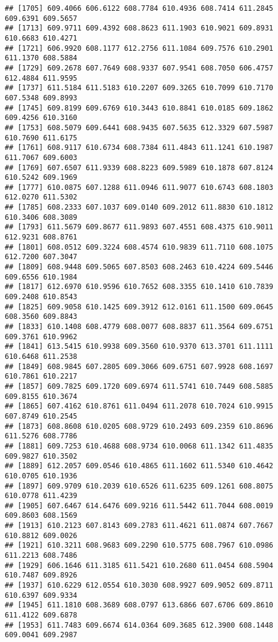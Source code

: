 \documentclass[
]{article}
\begin{document}
\begin{verbatim}
## [1705] 609.4066 606.6122 608.7784 610.4936 608.7414 611.2845 609.6391 609.5657
## [1713] 609.9711 609.4392 608.8623 611.1903 610.9021 609.8931 610.6683 610.4271
## [1721] 606.9920 608.1177 612.2756 611.1084 609.7576 610.2901 611.1370 608.5884
## [1729] 609.2678 607.7649 608.9337 607.9541 608.7050 606.4757 612.4884 611.9595
## [1737] 611.5184 611.5183 610.2207 609.3265 610.7099 610.7170 607.5348 609.8993
## [1745] 609.8199 609.6769 610.3443 610.8841 610.0185 609.1862 609.4256 610.3160
## [1753] 608.5079 609.6441 608.9435 607.5635 612.3329 607.5987 610.7690 611.6175
## [1761] 608.9117 610.6734 608.7384 611.4843 611.1241 610.1987 611.7067 609.6003
## [1769] 607.6507 611.9339 608.8223 609.5989 610.1878 607.8124 610.5242 609.1969
## [1777] 610.0875 607.1288 611.0946 611.9077 610.6743 608.1803 612.0270 611.5302
## [1785] 608.2333 607.1037 609.0140 609.2012 611.8830 610.1812 610.3406 608.3089
## [1793] 611.5679 609.8677 611.9893 607.4551 608.4375 610.9011 612.9231 608.8761
## [1801] 608.0512 609.3224 608.4574 610.9839 611.7110 608.1075 612.7200 607.3047
## [1809] 608.9448 609.5065 607.8503 608.2463 610.4224 609.5446 609.6556 610.1984
## [1817] 612.6970 610.9596 610.7652 608.3355 610.1410 610.7839 609.2408 610.8543
## [1825] 609.9058 610.1425 609.3912 612.0161 611.1500 609.0645 608.3560 609.8843
## [1833] 610.1408 608.4779 608.0077 608.8837 611.3564 609.6751 609.3761 610.9962
## [1841] 613.5415 610.9938 609.3560 610.9370 613.3701 611.1111 610.6468 611.2538
## [1849] 608.9845 607.2805 609.3066 609.6751 607.9928 608.1697 610.7861 610.2217
## [1857] 609.7825 609.1720 609.6974 611.5741 610.7449 608.5885 609.8155 610.3674
## [1865] 607.4162 610.8761 611.0494 611.2078 610.7024 610.9915 607.8749 610.2545
## [1873] 608.8608 610.0205 608.9729 610.2493 609.2359 610.8696 611.5276 608.7786
## [1881] 609.7253 610.4688 608.9734 610.0068 611.1342 611.4835 609.9827 610.3502
## [1889] 612.2057 609.0546 610.4865 611.1602 611.5340 610.4642 610.0705 610.1936
## [1897] 609.9709 610.2039 610.6526 611.6235 609.1261 608.8075 610.0778 611.4239
## [1905] 607.6467 614.6476 609.9216 611.5442 611.7044 608.0019 609.8603 608.1569
## [1913] 610.2123 607.8143 609.2783 611.4621 611.0874 607.7667 610.8812 609.0026
## [1921] 610.3211 608.9683 609.2290 610.5775 608.7967 610.0986 611.2213 608.7486
## [1929] 606.1646 611.3185 611.5421 610.2680 611.0454 608.5904 610.7487 609.8926
## [1937] 610.6229 612.0554 610.3030 608.9927 609.9052 609.8711 610.6397 609.9334
## [1945] 611.1810 608.3689 608.0797 613.6866 607.6706 609.8610 611.4122 609.6878
## [1953] 611.7483 609.6674 614.0364 609.3685 612.3900 608.1448 609.0041 609.2987

\end{verbatim}
\end{document}
